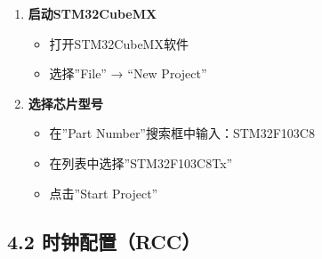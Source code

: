 \documentclass[
  chinese,
  UTF8,
  oneside,
  openany]{ctexbook}
\providecommand{\tightlist}{%
  \setlength{\itemsep}{0pt}\setlength{\parskip}{0pt}}
\begin{document}
\begin{enumerate}
\def\labelenumi{\arabic{enumi}.}
\tightlist
\item
  \textbf{启动STM32CubeMX}

  \begin{itemize}
  \tightlist
  \item
    打开STM32CubeMX软件
  \item
    选择''File'' → ``New Project''
  \end{itemize}
\item
  \textbf{选择芯片型号}

  \begin{itemize}
  \tightlist
  \item
    在''Part Number''搜索框中输入：STM32F103C8
  \item
    在列表中选择''STM32F103C8Tx''
  \item
    点击''Start Project''
  \end{itemize}
\end{enumerate}

\subsection{4.2 时钟配置（RCC）}\label{ux65f6ux949fux914dux7f6ercc}
\end{document}
